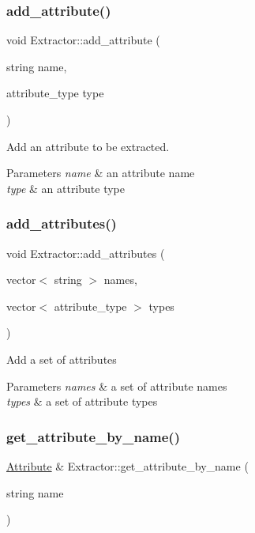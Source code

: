 \subsubsection{\texorpdfstring{add\+\_\+attribute()}{add\_attribute()}}
{\footnotesize\ttfamily void Extractor\+::add\+\_\+attribute (\begin{DoxyParamCaption}\item[{string}]{name,  }\item[{attribute\+\_\+type}]{type }\end{DoxyParamCaption})}

Add an attribute to be extracted. 
\begin{DoxyParams}{Parameters}
{\em name} & an attribute name \\
\hline
{\em type} & an attribute type \\
\hline
\end{DoxyParams}
\mbox{\label{classExtractor_a429e9f3ad4cfeb712b01c2617f2253e6}} 
\subsubsection{\texorpdfstring{add\+\_\+attributes()}{add\_attributes()}}
{\footnotesize\ttfamily void Extractor\+::add\+\_\+attributes (\begin{DoxyParamCaption}\item[{vector$<$ string $>$}]{names,  }\item[{vector$<$ attribute\+\_\+type $>$}]{types }\end{DoxyParamCaption})}

Add a set of attributes 
\begin{DoxyParams}{Parameters}
{\em names} & a set of attribute names \\
\hline
{\em types} & a set of attribute types \\
\hline
\end{DoxyParams}
\mbox{\label{classExtractor_a56a4af532b92d7dbe7aa6f9db242e992}} 
\subsubsection{\texorpdfstring{get\+\_\+attribute\+\_\+by\+\_\+name()}{get\_attribute\_by\_name()}}
{\footnotesize\ttfamily \hyperlink{classAttribute}{Attribute} \& Extractor\+::get\+\_\+attribute\+\_\+by\+\_\+name (\begin{DoxyParamCaption}\item[{string}]{name }\end{DoxyParamCaption})}

